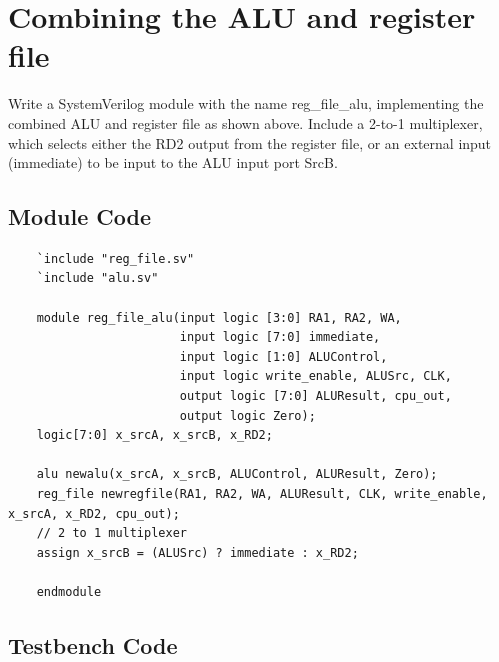 \documentclass{article}
\begin{document}
\newpage
\section{Combining the ALU and register file}
Write a SystemVerilog module with the name reg\_file\_alu, implementing the combined ALU and register file as shown above.
Include a 2-to-1 multiplexer, which selects either the RD2 output from the register file, or an external input (immediate) to be input to the ALU input port SrcB.

\subsection{Module Code}
\begin{lstlisting}
    `include "reg_file.sv"
    `include "alu.sv"
    
    module reg_file_alu(input logic [3:0] RA1, RA2, WA,
                        input logic [7:0] immediate,
                        input logic [1:0] ALUControl,
                        input logic write_enable, ALUSrc, CLK,
                        output logic [7:0] ALUResult, cpu_out,
                        output logic Zero);
    logic[7:0] x_srcA, x_srcB, x_RD2;
    
    alu newalu(x_srcA, x_srcB, ALUControl, ALUResult, Zero);
    reg_file newregfile(RA1, RA2, WA, ALUResult, CLK, write_enable, x_srcA, x_RD2, cpu_out);
    // 2 to 1 multiplexer
    assign x_srcB = (ALUSrc) ? immediate : x_RD2;
    
    endmodule

\end{lstlisting}
\subsection{Testbench Code}
\end{document}
